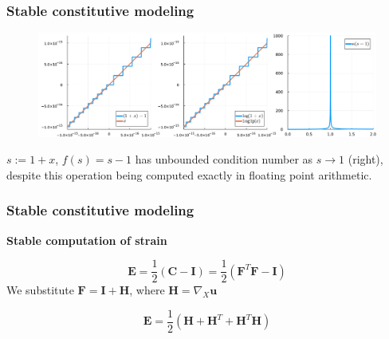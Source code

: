 \documentclass{beamer}
\begin{document}
\begin{frame}
	\frametitle{Stable constitutive modeling}
	\begin{figure} [h]
		\includegraphics[width=\textwidth]{../figs/rounding-cond.pdf}
	\end{figure}
	$s := 1 + x$, $f(s) = s - 1$ has unbounded condition number as $s\to 1$ (right), despite this operation being computed exactly in floating point arithmetic.
\end{frame}

\begin{frame}
	\frametitle{Stable constitutive modeling}
	\textbf{Stable computation of strain}
	
	\vspace{10mm}
	\begin{equation}
		\boldsymbol{E} =  \frac{1}{2} \left(\boldsymbol C - \boldsymbol{I} \right) = \frac{1}{2} \left(\boldsymbol{F}^T \boldsymbol{F} - \boldsymbol{I} \right) \nonumber
	\end{equation}
	We substitute $\boldsymbol F = \boldsymbol I + \boldsymbol H$, where $\boldsymbol H = \nabla_X \boldsymbol u$
	
	\begin{equation}
		\boldsymbol{E} =  \frac{1}{2} \left(\boldsymbol H + \boldsymbol H^T + \boldsymbol H^T \boldsymbol H \right) \nonumber
	\end{equation}
\end{frame}
\end{document}
